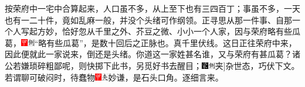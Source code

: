 按荣府中一宅中合算起来，人口虽不多，从上至下也有三四百丁；事虽不多，一天也有一二十件，竟如乱麻一般，并没个头绪可作纲领。正寻思从那一件事、自那一个人写起方妙，恰好忽从千里之外、芥豆之微、小小一个人家，因与荣府略有些瓜葛，{\includegraphics[width=3mm]{../Images/00002}\includegraphics[width=3mm]{../Images/00011}\footnotesize \kaishu ``略有些瓜葛''，是数十回后之正脉也。真千里伏线。}这日正往荣府中来，因此便就此一家说来，倒还是头绪。你道这一家姓甚名谁，又与荣府有甚瓜葛？诸公若嫌琐碎粗鄙呢，则快掷下此书，另觅好书去醒目；{\includegraphics[width=3mm]{../Images/00006}\includegraphics[width=3mm]{../Images/00011}\footnotesize \kaishu {(加)}{[}夹{]}杂世态，巧伏下文。}若谓聊可破闷时，待蠢物{\includegraphics[width=3mm]{../Images/00002}\includegraphics[width=3mm]{../Images/00012}\footnotesize \kaishu 妙谦，是石头口角。}逐细言来。

